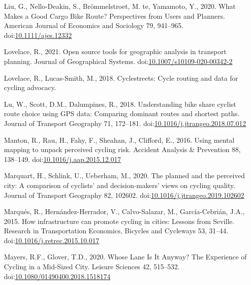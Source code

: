 \documentclass[]{elsarticle} %
\begin{document}
\leavevmode\hypertarget{ref-liuWhatMakesGood2020}{}%
Liu, G., Nello-Deakin, S., Brömmelstroet, M. te, Yamamoto, Y., 2020.
What Makes a Good Cargo Bike Route? Perspectives from Users and
Planners. American Journal of Economics and Sociology 79, 941--965.
doi:\href{https://doi.org/10.1111/ajes.12332}{10.1111/ajes.12332}

\leavevmode\hypertarget{ref-lovelaceOpenSource2021}{}%
Lovelace, R., 2021. Open source tools for geographic analysis in
transport planning. Journal of Geographical Systems.
doi:\href{https://doi.org/10.1007/s10109-020-00342-2}{10.1007/s10109-020-00342-2}

\leavevmode\hypertarget{ref-Lovelace2018}{}%
Lovelace, R., Lucas-Smith, M., 2018. Cyclestreets: Cycle routing and
data for cycling advocacy.

\leavevmode\hypertarget{ref-luUnderstandingBikeShare2018}{}%
Lu, W., Scott, D.M., Dalumpines, R., 2018. Understanding bike share
cyclist route choice using GPS data: Comparing dominant routes and
shortest paths. Journal of Transport Geography 71, 172--181.
doi:\href{https://doi.org/10.1016/j.jtrangeo.2018.07.012}{10.1016/j.jtrangeo.2018.07.012}

\leavevmode\hypertarget{ref-mantonUsingMentalMapping2016}{}%
Manton, R., Rau, H., Fahy, F., Sheahan, J., Clifford, E., 2016. Using
mental mapping to unpack perceived cycling risk. Accident Analysis \&
Prevention 88, 138--149.
doi:\href{https://doi.org/10.1016/j.aap.2015.12.017}{10.1016/j.aap.2015.12.017}

\leavevmode\hypertarget{ref-marquartPlannedPerceivedCity2020}{}%
Marquart, H., Schlink, U., Ueberham, M., 2020. The planned and the
perceived city: A comparison of cyclists' and decision-makers' views on
cycling quality. Journal of Transport Geography 82, 102602.
doi:\href{https://doi.org/10.1016/j.jtrangeo.2019.102602}{10.1016/j.jtrangeo.2019.102602}

\leavevmode\hypertarget{ref-marquesHowInfrastructureCan2015a}{}%
Marqués, R., Hernández-Herrador, V., Calvo-Salazar, M., García-Cebrián,
J.A., 2015. How infrastructure can promote cycling in cities: Lessons
from Seville. Research in Transportation Economics, Bicycles and
Cycleways 53, 31--44.
doi:\href{https://doi.org/10.1016/j.retrec.2015.10.017}{10.1016/j.retrec.2015.10.017}

\leavevmode\hypertarget{ref-mayersWhoseLaneIt2020}{}%
Mayers, R.F., Glover, T.D., 2020. Whose Lane Is It Anyway? The
Experience of Cycling in a Mid-Sized City. Leisure Sciences 42,
515--532.
doi:\href{https://doi.org/10.1080/01490400.2018.1518174}{10.1080/01490400.2018.1518174}
\end{document}
